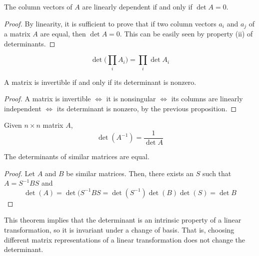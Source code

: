   \begin{proposition}
    The column vectors of $A$ are linearly dependent if and only if $\det{A} = 0$. 
  \end{proposition}
  \begin{proof}
    By linearity, it is sufficient to prove that if two column vectors $a_i$ and $a_j$ of a matrix $A$ are equal, then $\det{A} = 0$. This can be easily seen by property (ii) of determinants. 
  \end{proof}

  \begin{theorem}
    \begin{equation}
      \det{\bigg(\prod_i A_i \bigg)} = \prod_i \det{A_i}
    \end{equation}
  \end{theorem}

  \begin{theorem}
    A matrix is invertible if and only if its determinant is nonzero. 
  \end{theorem}
  \begin{proof}
    A matrix is invertible $\iff$ it is nonsingular $\iff$ its columns are linearly independent $\iff$ its determinant is nonzero, by the previous proposition. 
  \end{proof}

  \begin{corollary}
    Given $n \times n$ matrix $A$,
    \begin{equation}
      \det{(A^{-1})} = \frac{1}{\det{A}}
    \end{equation}
  \end{corollary}

  \begin{theorem}
    The determinants of similar matrices are equal. 
  \end{theorem}
  \begin{proof}
    Let $A$ and $B$ be similar matrices. Then, there exists an $S$ such that $A = S^{-1} B S$ and 
    \begin{equation}
      \det{(A)} = \det{(S^{-1} B S} = \det{(S^{-1})} \det{(B)} \det{(S)} = \det{B}
    \end{equation}
  \end{proof}

  This theorem implies that the determinant is an intrinsic property of a linear transformation, so it is invariant under a change of basis. That is, choosing different matrix representations of a linear transformation does not change the determinant.  

